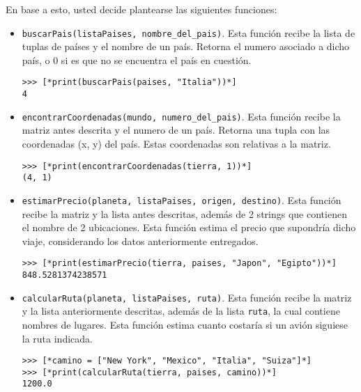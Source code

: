 En base a esto, usted decide plantearse las siguientes funciones:

\begin{itemize}
    \item \texttt{buscarPais(listaPaises, nombre\_del\_pais)}. Esta función recibe la lista de tuplas de países y el nombre de un país. Retorna el numero asociado a dicho país, o 0 si es que no se encuentra el país en cuestión.

\begin{lstlisting}[style=consola]
>>> [*print(buscarPais(paises, "Italia"))*]
4
\end{lstlisting}

    \item \texttt{encontrarCoordenadas(mundo, numero\_del\_pais)}. Esta función recibe la matriz antes descrita y el numero de un país. Retorna una tupla con las coordenadas (x, y) del país. Estas coordenadas son relativas a la matriz.

\begin{lstlisting}[style=consola]
>>> [*print(encontrarCoordenadas(tierra, 1))*]
(4, 1)
\end{lstlisting}

    \item \texttt{estimarPrecio(planeta, listaPaises, origen, destino)}. Esta función recibe la matriz y la lista antes descritas, además de 2 strings que contienen el nombre de 2 ubicaciones. Esta función estima el precio que supondría dicho viaje, considerando los datos anteriormente entregados.

\begin{lstlisting}[style=consola]
>>> [*print(estimarPrecio(tierra, paises, "Japon", "Egipto"))*]
848.5281374238571
\end{lstlisting}

    \item \texttt{calcularRuta(planeta, listaPaises, ruta)}. Esta función recibe la matriz y la lista anteriormente descritas, además de la lista \texttt{ruta}, la cual contiene nombres de lugares. Esta función estima cuanto costaría si un avión siguiese la ruta indicada.

\begin{lstlisting}[style=consola]
>>> [*camino = ["New York", "Mexico", "Italia", "Suiza"]*]
>>> [*print(calcularRuta(tierra, paises, camino))*]
1200.0
\end{lstlisting}

\end{itemize}
